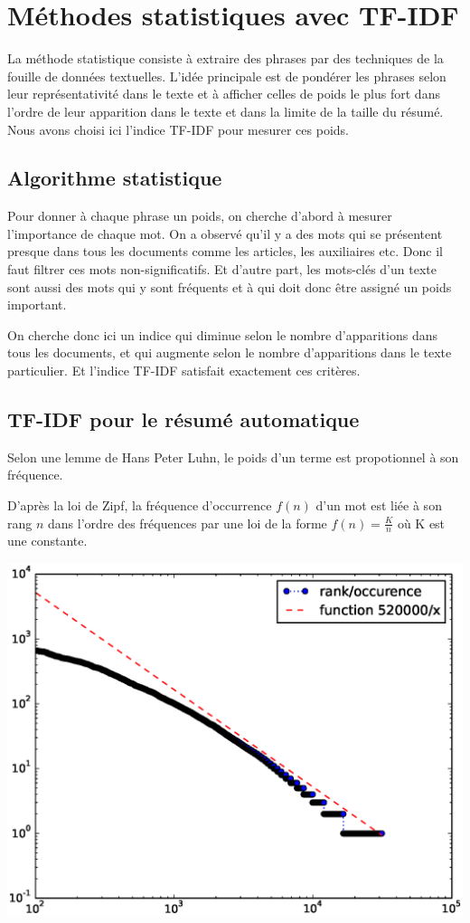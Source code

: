 \documentclass[a4paper, 12pt]{article}
\begin{document}
\section{Méthodes statistiques avec TF-IDF}\label{Section:TFIDF}

La méthode statistique consiste à extraire des phrases par des techniques de la fouille de données textuelles. L'idée principale est de pondérer les phrases selon leur représentativité dans le texte et à afficher celles de poids le plus fort dans l'ordre de leur apparition dans le texte et dans la limite de la taille du résumé. Nous avons choisi ici l'indice TF-IDF pour mesurer ces poids.

\subsection{Algorithme statistique}

Pour donner à chaque phrase un poids, on cherche d'abord à mesurer l'importance de chaque mot. On a observé qu'il y a des mots qui se présentent presque dans tous les documents comme les articles, les auxiliaires etc. Donc il faut filtrer ces mots non-significatifs. Et d'autre part, les mots-clés d'un texte sont aussi des mots qui y sont fréquents et à qui doit donc être assigné un poids important.

On cherche donc ici un indice qui diminue selon le nombre d'apparitions dans tous les documents, et qui augmente selon le nombre d'apparitions dans le texte particulier. Et l'indice TF-IDF satisfait exactement ces critères.


\subsection{TF-IDF pour le résumé automatique}
Selon une lemme de Hans Peter Luhn, le poids d'un terme est propotionnel à son fréquence.

D'après la loi de Zipf, la fréquence d'occurrence $f(n)$ d'un mot est liée à son rang $n$ dans l'ordre des fréquences par une loi de la forme $f(n) = \frac{K}{n} $ où K est une constante.

\includegraphics[scale=0.5]{loi_de_zipf.eps}
\end{document}
